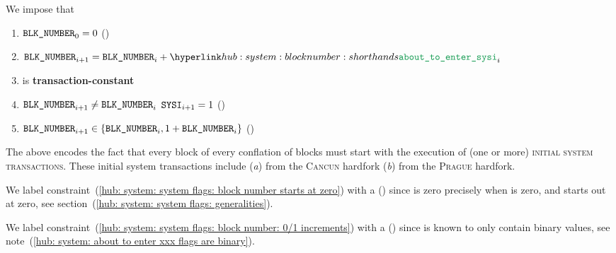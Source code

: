 We impose that
\begin{enumerate}
	\item
		\label{hub: system: system flags: block number starts at zero}
		$\texttt{BLK\_NUMBER} _{0} = 0$ (\sanityCheck)
	\item
		$\blockNumber _{i + 1} = \blockNumber _{i} + \aboutToEnterSystemInit _{i}$
	\item
		\blockNumber{} is \textbf{transaction-constant}
	\item
		\label{hub: system: system flags: block number: blocks start with sysi}
		\If   $\texttt{BLK\_NUMBER} _{i + 1} \neq \texttt{BLK\_NUMBER} _{i}$
		\Then $\texttt{SYSI} _{i + 1} = 1$ (\sanityCheck)
	\item
		\label{hub: system: system flags: block number: 0/1 increments}
		$\texttt{BLK\_NUMBER} _{i + 1} \in \{ \texttt{BLK\_NUMBER} _{i}, 1 + \texttt{BLK\_NUMBER} _{i} \}$ (\sanityCheck)
\end{enumerate}
\saNote{} \label{hub: system: system flags: block number increments and initial system transactions}
The above encodes the fact that every block of every conflation of blocks
must start with the execution of (one or more) \textsc{initial system transactions}.
These initial system transactions include
(\emph{a}) \cite{EIP-4788} from the \textsc{Cancun} hardfork
(\emph{b}) \cite{EIP-2935} from the \textsc{Prague} hardfork.


\saNote{}
We label constraint~(\ref {hub: system: system flags: block number starts at zero}) with a (\sanityCheck) since
\blockNumber{} is zero precisely when \flagSum{} is zero, and
\flagSum{} starts out at zero,
see section~(\ref{hub: system: system flags: generalities}).

\saNote{}
We label constraint~(\ref{hub: system: system flags: block number: 0/1 increments}) with a (\sanityCheck) since
\aboutToEnterSystemInit{} is known to only contain binary values,
see note~(\ref{hub: system: about to enter xxx flags are binary}).
